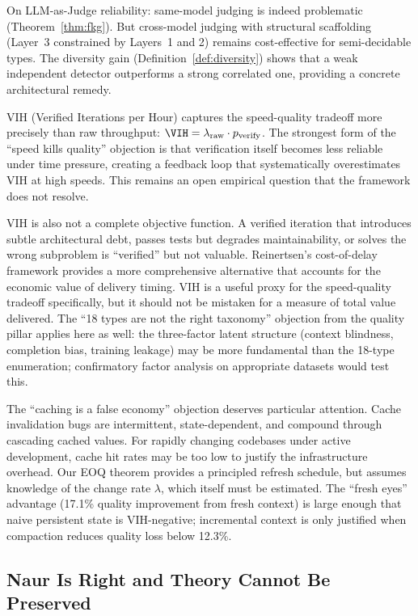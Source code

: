 On LLM-as-Judge reliability: same-model judging is indeed problematic (Theorem~\ref{thm:fkg}). But cross-model judging with structural scaffolding (Layer~3 constrained by Layers~1 and 2) remains cost-effective for semi-decidable types. The diversity gain (Definition~\ref{def:diversity}) shows that a weak independent detector outperforms a strong correlated one, providing a concrete architectural remedy.

VIH (Verified Iterations per Hour) captures the speed-quality tradeoff more precisely than raw throughput: $\VIH = \lambda_{\mathrm{raw}} \cdot p_{\mathrm{verify}}$. The strongest form of the ``speed kills quality'' objection is that verification itself becomes less reliable under time pressure, creating a feedback loop that systematically overestimates VIH at high speeds. This remains an open empirical question that the framework does not resolve.

VIH is also not a complete objective function. A verified iteration that introduces subtle architectural debt, passes tests but degrades maintainability, or solves the wrong subproblem is ``verified'' but not valuable. Reinertsen's cost-of-delay framework provides a more comprehensive alternative that accounts for the economic value of delivery timing. VIH is a useful proxy for the speed-quality tradeoff specifically, but it should not be mistaken for a measure of total value delivered. The ``18 types are not the right taxonomy'' objection from the quality pillar applies here as well: the three-factor latent structure (context blindness, completion bias, training leakage) may be more fundamental than the 18-type enumeration; confirmatory factor analysis on appropriate datasets would test this.

The ``caching is a false economy'' objection deserves particular attention. Cache invalidation bugs are intermittent, state-dependent, and compound through cascading cached values. For rapidly changing codebases under active development, cache hit rates may be too low to justify the infrastructure overhead. Our EOQ theorem provides a principled refresh schedule, but assumes knowledge of the change rate $\lambda$, which itself must be estimated. The ``fresh eyes'' advantage (17.1\% quality improvement from fresh context) is large enough that naive persistent state is VIH-negative; incremental context is only justified when compaction reduces quality loss below 12.3\%.


\subsection{Naur Is Right and Theory Cannot Be Preserved}
\label{sec:contrarian-naur}

